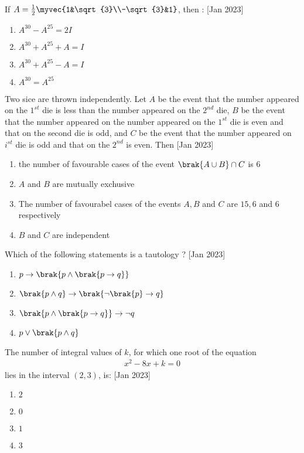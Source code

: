 	\item If $A=\frac{1}{2}\myvec{1&\sqrt{3}\\-\sqrt{3}&1}$, then :
		\hfill{[Jan 2023]}
		\begin{enumerate}
			\item $A^{30}-A^{25}=2I$
			\item $A^{30}+A^{25}+A=I$
			\item $A^{30}+A^{25}-A=I$
	                \item $A^{30}=A^{25}$
        	\end{enumerate}
	\item Two sice are thrown independently. Let $A$ be the event that the number appeared on the $1^{st}$ die is less than the number appeared on the $2^{nd}$ die, $B$ be the event that the number appeared on the number appeared on the $1^{st}$ die is even and that on the second die is odd, and $C$ be the event that the number appeared on $i^{st}$ die is odd and that on the $2^{nd}$ is even. Then
		\hfill{[Jan 2023]}
		\begin{enumerate}
			\item the number of favourable cases of the event $\brak{A \cup B}\cap C$ is $6$
			\item $A$ and $B$ are mutually exchusive 
			\item The number of favourabel cases of the events $A,B$ and $C$ are $15,6$ and $6$ respectively 
			\item $B$ and $C$ are independent
        	\end{enumerate}	
	\item Which of the following statements is a tautology ?
		\hfill{[Jan 2023]}
		\begin{enumerate}
			\item $p \rightarrow \brak{p\wedge \brak{p \rightarrow q}}$
			\item $\brak{p\wedge q}\rightarrow \brak{\neg\brak{p}\rightarrow q}$
			\item $\brak{p\wedge \brak {p \rightarrow q}}\rightarrow \neg q$
			\item $p \lor \brak {p \wedge q}$
        	\end{enumerate}
	\item The number of integral values of $k$, for which one root of the equation 
              \begin{align*}
		x^2-8x+k=0
              \end{align*}
		      lies in the interval $(2,3)$, is:
		      	\hfill{[Jan 2023]}
		\begin{enumerate}
			\item $2$
			\item $0$
			\item $1$
			\item $3$
        	\end{enumerate}
